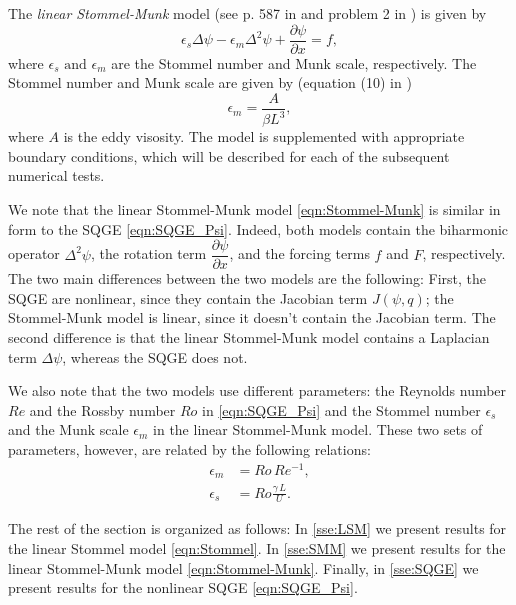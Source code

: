 The \emph{linear Stommel-Munk} model (see p. 587 in \cite{Vallis06} and problem
2 in \cite{Cascon}) is given by
\begin{equation}
  \epsilon_s \Delta \psi - \epsilon_m \Delta^2 \psi + \frac{\partial \psi}{\partial x} = f,
  \label{eqn:Stommel-Munk}
\end{equation}
where $\epsilon_s \text{ and } \epsilon_m$ are the Stommel number and Munk
scale, respectively. The Stommel number and Munk scale are given by (equation
(10) in \cite{Myers})
\begin{equation*}
  \epsilon_m = \frac{A}{\beta L^3},
\end{equation*}
where $A$ is the eddy visosity.  The model is supplemented with appropriate
boundary conditions, which will be described for each of the subsequent
numerical tests.

We note that the linear Stommel-Munk model \eqref{eqn:Stommel-Munk} is similar
in form to the SQGE \eqref{eqn:SQGE_Psi}. Indeed, both models contain the
biharmonic operator $\Delta^2 \psi$, the rotation term $\dfrac{\partial
\psi}{\partial x}$, and the forcing terms $f$ and $F$, respectively. The two
main differences between the two models are the following: First, the SQGE are
nonlinear, since they contain the Jacobian term $J(\psi,q)$; the Stommel-Munk
model is linear, since it doesn't contain the Jacobian term. The second
difference is that the linear Stommel-Munk model contains a Laplacian term
$\Delta \psi$, whereas the SQGE does not.

We also note that the two models use different parameters: the Reynolds number
$Re$ and the Rossby number $Ro$ in \eqref{eqn:SQGE_Psi} and the Stommel number
$\epsilon_s$ and the Munk scale $\epsilon_m$ in the linear Stommel-Munk model.
These two sets of parameters, however, are related by the following relations:
\begin{align}
  \epsilon_m &= Ro\, Re^{-1}, \label{eqn:Munkscale}\\
  \epsilon_s &= Ro \frac{\gamma\, L}{U}. \label{eqn:Stommelnumber}
\end{align}

The rest of the section is organized as follows: In \autoref{sse:LSM} we
present results for the linear Stommel model \eqref{eqn:Stommel}. In
\autoref{sse:SMM} we present results for the linear Stommel-Munk model
\eqref{eqn:Stommel-Munk}. Finally, in \autoref{sse:SQGE} we present results for
the nonlinear SQGE \eqref{eqn:SQGE_Psi}.

